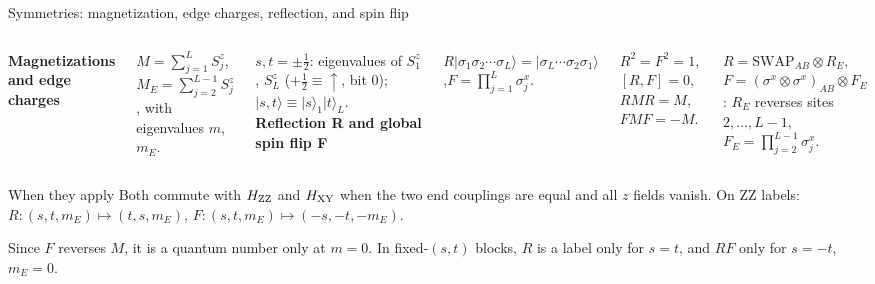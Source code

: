 \documentclass[aspectratio=169,10pt]{beamer}
\newcommand{\ket}[1]{\lvert #1\rangle}
\newcommand{\sechead}[1]{{\color{sea}\bfseries #1}\par\vspace{1mm}}
\newcommand{\noteinline}[1]{{\color{muted}\footnotesize #1}}
\begin{document}
\begin{frame}{Symmetries: magnetization, edge charges, reflection, and spin flip}
\begin{columns}[T,onlytextwidth]
\sechead{Magnetizations and edge charges}
\(M=\sum_{j=1}^{L}S_j^z\), \(M_E=\sum_{j=2}^{L-1}S_j^z\), with eigenvalues \(m\), \(m_E\).
\par\vspace{.12cm}
\(s,t=\pm\tfrac12\): eigenvalues of \(S_1^z\), \(S_L^z\) (\(+\tfrac12\equiv\uparrow\), bit 0); \(\ket{s,t}\equiv\ket{s}_1\ket{t}_L\).
\sechead{Reflection R and global spin flip F}
\(R\ket{\sigma_1\sigma_2\cdots\sigma_L}=\ket{\sigma_L\cdots\sigma_2\sigma_1}\),\quad \(F=\prod_{j=1}^{L}\sigma_j^x\).
\par\vspace{.08cm}
\(R^2=F^2=1\), \([R,F]=0\), \(RMR=M\), \(FMF=-M\).
\par\vspace{.08cm}
\(R=\mathrm{SWAP}_{AB}\otimes R_E\), \(F=(\sigma^x\!\otimes\sigma^x)_{AB}\otimes F_E\): \(R_E\) reverses sites \(2,\ldots,L-1\), \(F_E=\prod_{j=2}^{L-1}\sigma_j^x\).
\end{columns}
\vspace{.15cm}
\begin{block}{When they apply}
Both commute with \(H_{\rm ZZ}\) and \(H_{\rm XY}\) when the two end couplings are equal and all \(z\) fields vanish. On ZZ labels: \(R\colon(s,t,m_E)\mapsto(t,s,m_E)\), \(F\colon(s,t,m_E)\mapsto(-s,-t,-m_E)\).
\end{block}
\vspace{.05cm}
\noteinline{Since \(F\) reverses \(M\), it is a quantum number only at \(m=0\). In fixed-\((s,t)\) blocks, \(R\) is a label only for \(s=t\), and \(RF\) only for \(s=-t\), \(m_E=0\).}
\end{frame}
\end{document}
